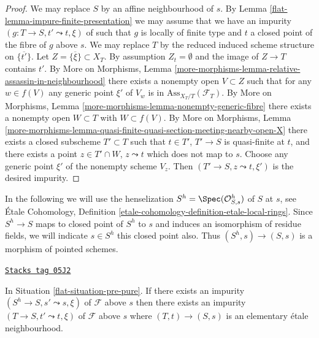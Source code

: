 \begin{proof}

We may replace $S$ by an affine neighbourhood of $s$. By
Lemma \ref{flat-lemma-impure-finite-presentation}
we may assume that we have an impurity $(g : T \to S, t' \leadsto t, \xi)$
of such that $g$ is locally of finite type and $t$ a closed point of the
fibre of $g$ above $s$. We may replace $T$ by the reduced induced
scheme structure on $\overline{\{t'\}}$. Let
$Z = \overline{\{\xi\}} \subset X_T$. By assumption $Z_t = \emptyset$
and the image of $Z \to T$ contains $t'$. By
More on Morphisms,
Lemma \ref{more-morphisms-lemma-relative-assassin-in-neighbourhood}
there exists a nonempty open $V \subset Z$ such that for any
$w \in f(V)$ any generic point $\xi'$ of $V_w$ is in
$\text{Ass}_{X_T/T}(\mathcal{F}_T)$. By
More on Morphisms, Lemma \ref{more-morphisms-lemma-nonempty-generic-fibre}
there exists a nonempty open $W \subset T$ with $W \subset f(V)$. By
More on Morphisms, Lemma
\ref{more-morphisms-lemma-quasi-finite-quasi-section-meeting-nearby-open-X}
there exists a closed subscheme $T' \subset T$ such that
$t \in T'$, $T' \to S$ is quasi-finite at $t$, and there exists a point
$z \in T' \cap W$, $z \leadsto t$ which does not map to $s$.
Choose any generic point $\xi'$ of the nonempty scheme $V_z$.
Then $(T' \to S, z \leadsto t, \xi')$ is the desired impurity.
\end{proof}

In the following we will use the henselization
$S^h = \Spec(\mathcal{O}_{S, s}^h)$
of $S$ at $s$, see
\'Etale Cohomology,
Definition \ref{etale-cohomology-definition-etale-local-rings}.
Since $S^h \to S$ maps to closed point of $S^h$ to $s$ and
induces an isomorphism of residue fields, we will indicate
$s \in S^h$ this closed point also. Thus $(S^h, s) \to (S, s)$ is
a morphism of pointed schemes.

\begin{lemma}
\label{flat-lemma-impurity-on-henselization}
\href{https://stacks.math.columbia.edu/tag/05J2}{\texttt{Stacks tag 05J2}}

In Situation \ref{flat-situation-pre-pure}.
If there exists an impurity $(S^h \to S, s' \leadsto s, \xi)$
of $\mathcal{F}$ above $s$ then there exists an impurity
$(T \to S, t' \leadsto t, \xi)$ of $\mathcal{F}$ above $s$
where $(T, t) \to (S, s)$ is an elementary \'etale neighbourhood.
\end{lemma}

